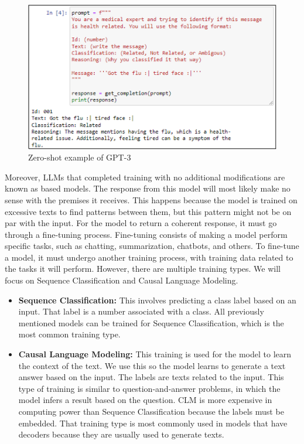  \begin{figure}[!h]
    \centering
        \includegraphics[width=0.9\linewidth]{images/gpt_example.png}
        \caption{Zero-shot example of GPT-3}
        \label{gpt_example}
\end{figure}


Moreover, LLMs that completed training with no additional modifications are known as based models. The response from this model will most likely make no sense with the premises it receives.
This happens because the model is trained on excessive texts to find patterns between them, but this pattern might not be on par with the input. For the model to return a coherent response, it must go through
a fine-tuning process. Fine-tuning consists of making a model perform specific tasks, such as chatting, summarization, chatbots, and others. To fine-tune a model, it must undergo another training process, with
training data related to the tasks it will perform. However, there are multiple training types. We will focus on Sequence Classification and Causal Language Modeling.

\begin{itemize}
\item{\textbf{Sequence Classification:}} This involves predicting a class label based on an input. That label is a number associated with a class. All previously mentioned models can be trained for Sequence
Classification, which is the most common training type.

\item{\textbf{Causal Language Modeling:}} This training is used for the model to learn the context of the text. We use this so the model learns to generate a text answer based on the input. The labels are texts related to the input.
This type of training is similar to question-and-answer problems, in which the model infers a result based on the question. CLM is more expensive in computing power than Sequence Classification because 
the labels must be embedded. That training type is most commonly used in models that have decoders because they are usually used to generate texts.

\end{itemize}


